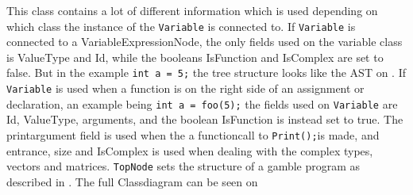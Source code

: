This class contains a lot of different information which is used depending on which class the instance of the \texttt{Variable} is connected to.
If \texttt{Variable} is connected to a VariableExpressionNode, the only fields used on the variable class is ValueType and Id, while the booleans IsFunction and IsComplex are set to false.
But in the example \texttt{int a = 5;} the tree structure looks like the AST on .
If \texttt{Variable} is used when a function is on the right side of an assignment or declaration, an example being \texttt{int a = foo(5);} the fields used on \texttt{Variable} are Id, ValueType, arguments, and the boolean IsFunction is instead set to true.
The printargument field is used when the a functioncall to \texttt{Print();}is made, and entrance, size and IsComplex is used when dealing with the complex types, vectors and matrices.
\texttt{TopNode} sets the structure of a \gls{gamble} program as described in . 
The full Classdiagram can be seen on 

